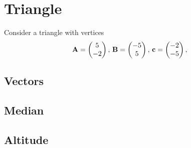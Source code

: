 \documentclass[11pt]{book}
\begin{document}
\frontmatter
\tableofcontents
\setcounter{page}{1}
\mainmatter
\chapter{Triangle}
Consider a triangle with vertices
\begin{align}
\label{eq:tri-pts}
\vec{A}=\myvec{5 \\ -2},\,
\vec{B}=\myvec{-5\\5},\,
	\vec{c}=\myvec{-2\\-5},\,
\end{align}

\section{Vectors}
\section{Median}
\section{Altitude}
\end{document}
